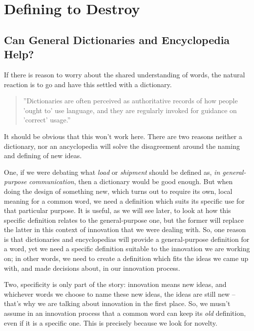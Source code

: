 \documentclass[graybox,envcountchap,sectrefs]{svmono}
\begin{document}
\newpage


\chapter{Defining to Destroy}\label{c:plastic-definition}




\section{Can General Dictionaries and Encyclopedia Help?}
If there is reason to worry about the shared understanding of words, the natural reaction is to go and have this settled with a dictionary. 

\begin{quote}
''Dictionaries are often perceived as authoritative records of how people 'ought to' use language, and they are regularly invoked for guidance on 'correct' usage.'' \cite{atkins2008oxford}
\end{quote}

It should be obvious that this won't work here. There are two reasons neither a dictionary, nor an ancyclopedia will solve the disagreement around the naming and defining of new ideas.

One, if we were debating what \textit{load} or \textit{shipment} should be defined as, \textit{in general-purpose communication}, then a dictionary would be good enough. But when doing the design of something new, which turns out to require its own, local meaning for a common word, we need a definition which suits its specific use for that particular purpose. It is useful, as we will see later, to look at how this specific definition relates to the general-purpose one, but the former will replace the latter in this context of innovation that we were dealing with. So, one reason is that dictionaries and encyclopedias will provide a general-purpose definition for a word, yet we need a specific definition suitable to the innovation we are working on; in other words, we need to create a definition which fits the ideas we came up with, and made decisions about, in our innovation process.

Two, specificity is only part of the story: innovation means new ideas, and whichever words we choose to name these new ideas, the ideas are still new -- that's why we are talking about innovation in the first place. So, we musn't assume in an innovation process that a common word can keep its \textit{old} definition, even if it is a specific one. This is precisely because we look for novelty. 
\end{document}

